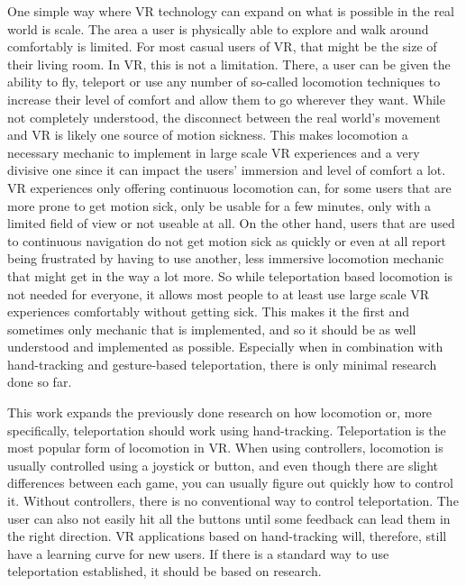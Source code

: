 One simple way where VR technology can expand on what is possible in the real world is scale. The area a user is physically able to explore and walk around comfortably is limited. For most casual users of VR, that might be the size of their living room. In VR, this is not a limitation. There, a user can be given the ability to fly, teleport or use any number of so-called locomotion techniques to increase their level of comfort and allow them to go wherever they want. While not completely understood, the disconnect between the real world's movement and VR is likely one source of motion sickness. This makes locomotion a necessary mechanic to implement in large scale VR experiences and a very divisive one since it can impact the users' immersion and level of comfort a lot. VR experiences only offering continuous locomotion can, for some users that are more prone to get motion sick, only be usable for a few minutes, only with a limited field of view or not useable at all. On the other hand, users that are used to continuous navigation do not get motion sick as quickly or even at all report being frustrated by having to use another, less immersive locomotion mechanic that might get in the way a lot more. So while teleportation based locomotion is not needed for everyone, it allows most people to at least use large scale VR experiences comfortably without getting sick. This makes it the first and sometimes only mechanic that is implemented, and so it should be as well understood and implemented as possible. Especially when in combination with hand-tracking and gesture-based teleportation, there is only minimal research done so far.

This work expands the previously done research on how locomotion or, more specifically, teleportation should work using hand-tracking. Teleportation is the most popular form of locomotion in VR. When using controllers, locomotion is usually controlled using a joystick or button, and even though there are slight differences between each game, you can usually figure out quickly how to control it. Without controllers, there is no conventional way to control teleportation. The user can also not easily hit all the buttons until some feedback can lead them in the right direction. VR applications based on hand-tracking will, therefore, still have a learning curve for new users. If there is a standard way to use teleportation established, it should be based on research. 


